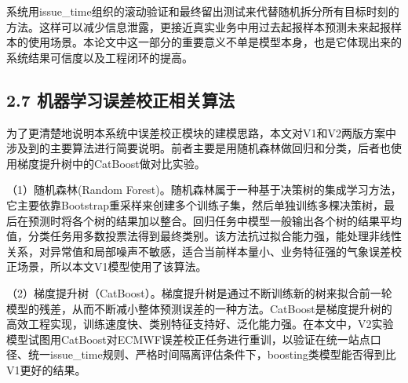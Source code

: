 系统用issue\_time组织的滚动验证和最终留出测试来代替随机拆分所有目标时刻的方法。这样可以减少信息泄露，更接近真实业务中用过去起报样本预测未来起报样本的使用场景。本论文中这一部分的重要意义不单是模型本身，也是它体现出来的系统结果可信度以及工程闭环的提高。

\subsection{2.7 机器学习误差校正相关算法}

为了更清楚地说明本系统中误差校正模块的建模思路，本文对V1和V2两版方案中涉及到的主要算法进行简要说明。前者主要是用随机森林做回归和分类，后者也使用梯度提升树中的CatBoost做对比实验。

（1）随机森林(Random Forest)。随机森林属于一种基于决策树的集成学习方法，它主要依靠Bootstrap重采样来创建多个训练子集，然后单独训练多棵决策树，最后在预测时将各个树的结果加以整合。回归任务中模型一般输出各个树的结果平均值，分类任务用多数投票法得到最终类别。该方法抗过拟合能力强，能处理非线性关系，对异常值和局部噪声不敏感，适合当前样本量小、业务特征强的气象误差校正场景，所以本文V1模型使用了该算法。

（2）梯度提升树（CatBoost）。梯度提升树是通过不断训练新的树来拟合前一轮模型的残差，从而不断减小整体预测误差的一种方法。CatBoost是梯度提升树的高效工程实现，训练速度快、类别特征支持好、泛化能力强。在本文中，V2实验模型试图用CatBoost对ECMWF误差校正任务进行重训，以验证在统一站点口径、统一issue\_time规则、严格时间隔离评估条件下，boosting类模型能否得到比V1更好的结果。

